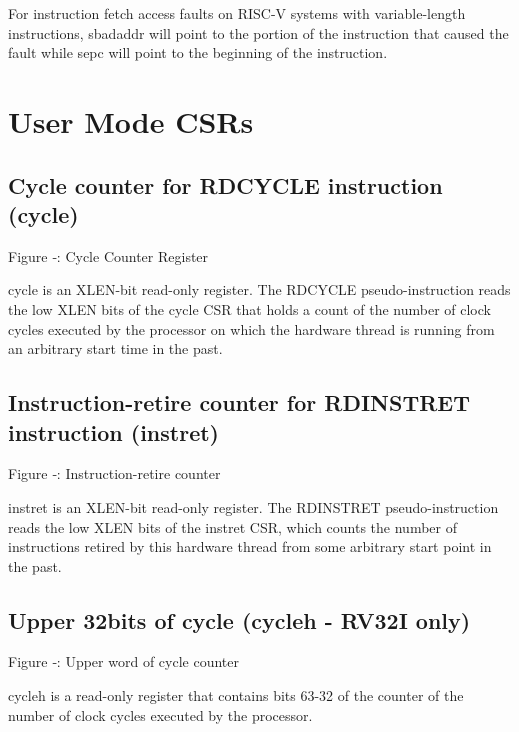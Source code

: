 For instruction fetch access faults on RISC-V systems with
variable-length instructions, sbadaddr will point to the portion of the
instruction that caused the fault while sepc will point to the beginning
of the instruction.

\protect\hypertarget{_Toc327108372}{}{}

\section{User Mode CSRs}\label{user-mode-csrs}

\subsection{Cycle counter for RDCYCLE instruction
(cycle)}\label{cycle-counter-for-rdcycle-instruction-cycle}

\missingfigure{}

Figure ‑: Cycle Counter Register

cycle is an XLEN-bit read-only register. The RDCYCLE pseudo-instruction
reads the low XLEN bits of the cycle CSR that holds a count of the
number of clock cycles executed by the processor on which the hardware
thread is running from an arbitrary start time in the past.

\subsection{Instruction-retire counter for RDINSTRET instruction
(instret)}\label{instruction-retire-counter-for-rdinstret-instruction-instret}

\missingfigure{}

Figure ‑: Instruction-retire counter

instret is an XLEN-bit read-only register. The RDINSTRET
pseudo-instruction reads the low XLEN bits of the instret CSR, which
counts the number of instructions retired by this hardware thread from
some arbitrary start point in the past.

\subsection{Upper 32bits of cycle (cycleh - RV32I
only)}\label{upper-32bits-of-cycle-cycleh---rv32i-only}

\missingfigure{}

Figure ‑: Upper word of cycle counter

cycleh is a read-only register that contains bits 63-32 of the counter
of the number of clock cycles executed by the processor.

